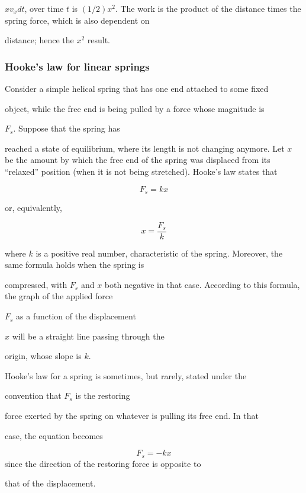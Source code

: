 $xv_x dt$, over time $t$ is $(1/2)x^2$. The work is the product of the distance times the spring force, which is also dependent on

distance; hence the $x^2$ result.


\subsubsection{Hooke's law for linear springs}
\label{sss:hook-9335}


Consider a simple helical spring that has one end attached to some fixed

object, while the free end is being pulled by a force whose magnitude is

$F_s$. Suppose that the spring has

reached a state of equilibrium, where its length is not changing anymore. Let $x$ be the amount by which the free end of the spring was displaced from its ``relaxed'' position (when it is not being stretched). Hooke's law states that


\[
F_s = kx
\]


or, equivalently,


\[
x = \frac{F_s}{k}
\]


where $k$ is a positive real number, characteristic of the spring. Moreover, the same formula holds when the spring is

compressed, with $F_s$ and $x$ both negative in that case. According to this formula, the graph of the applied force

$F_s$ as a function of the displacement

$x$ will be a straight line passing through the

origin, whose slope is $k$.


Hooke's law for a spring is sometimes, but rarely, stated under the

convention that $F_s$ is the restoring

force exerted by the spring on whatever is pulling its free end. In that

case, the equation becomes


\[
F_s = -kx
\] since the direction of the restoring force is opposite to

that of the displacement.


